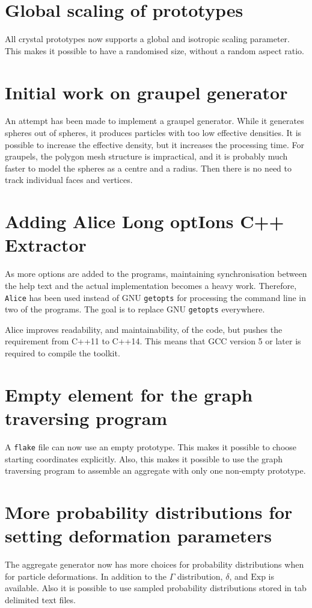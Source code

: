 \documentclass[a4paper,10pt]{scrartcl}
\newcommand{\prgname}[1]{\texttt{#1}}
\begin{document}
\section{Global scaling of prototypes}
All crystal prototypes now supports a global and isotropic scaling parameter. This makes it possible to have a randomised size, without a random aspect ratio.

\section{Initial work on graupel generator}
An attempt has been made to implement a graupel generator. While it generates spheres out of spheres, it produces particles with too low effective densities. It is possible to increase the effective density, but it increases the processing time. For graupels, the polygon mesh structure is impractical, and it is probably much faster to model the spheres as a centre and a radius. Then there is no need to track individual faces and vertices.

\section{Adding Alice Long optIons C++ Extractor}
As more options are added to the programs, maintaining synchronisation between the help text and the actual implementation becomes a heavy work. Therefore, \prgname{Alice}\cite{alice} has been used instead of GNU \prgname{getopts} for processing the command line in two of the programs. The goal is to replace GNU \prgname{getopts} everywhere.

Alice improves readability, and maintainability, of the code, but pushes the requirement from C++11 to C++14. This means that GCC version 5 or later\cite{GCC} is required to compile the toolkit.

\section{Empty element for the graph traversing program}
A \texttt{flake} file can now use an empty prototype. This makes it possible to choose starting coordinates explicitly. Also, this makes it possible to use the graph traversing program to assemble an aggregate with only one non-empty prototype.

\section{More probability distributions for setting deformation parameters}
The aggregate generator now has more choices for probability distributions when for particle deformations. In addition to the $\Gamma$ distribution, $\delta$, and $\text{Exp}$ is available. Also it is possible to use sampled probability distributions stored in tab delimited text files.
\end{document}
